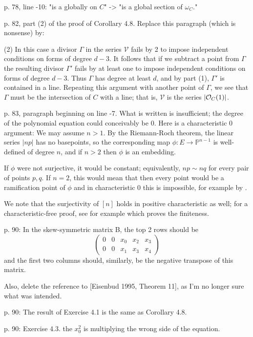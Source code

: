 \documentclass[twoside,12pt, leqno]{amsart}
\def\PP{{\mathbb P}}
\begin{document}
p. 78, line -10: "is a globally on $C$" -> "is a global section of $\omega_C$."

p. 82, part (2) of the proof of Corollary 4.8. Replace this paragraph (which is nonsense) by:

(2) In this case a divisor $\Gamma$ in the series $\mathcal V$ fails by 2 to impose independent conditions
on forms of degree $d-3$. It follows that if we subtract a point from $\Gamma$ the resulting divisor $\Gamma'$ fails
by at least one to impose independent conditions on forms of degree $d-3$. Thus $\Gamma$ has degree
at least $d$, and by part (1), $\Gamma'$ is contained in a line. Repeating this argument with another point of $\Gamma$,
we see that $\Gamma$ must be the intersection of $C$ with a line; that is, $\mathcal V$ is the series $|{\mathcal O}_C(1)|$.

p. 83, paragraph beginning on line -7. What is written is insufficient; the degree of the polynomial equation could conceivably be 0.  Here is a characteristic 0 argument:
We may assume $n>1$. By the Riemann-Roch theorem, the linear series $|np|$ has no basepoints, so the corresponding map $\phi: E \to \PP^{n-1}$ 
is well-defined of degree $n$, and if $n>2$ then $\phi$ is an embedding.

 If $\phi$ were not surjective, it would be constant; equivalently, $np\sim nq$ for every
pair of points $p,q$. If $n=2$, this would mean that  then every point would be a ramification point of 
$\phi$ and in characteristic 0 this is impossible, for example by \cite[Theorem 7.11a]{3264}.

We note that the surjectivity of $[n]$ holds in positive characteristic as well; for a characteristic-free proof, see for example \cite[Corollary 6.4]{Silverman} which proves the finiteness.

p. 90: In the skew-symmetric matrix B, the top 2 rows should be
$$
\begin{pmatrix}
 0&0&x_{0}&x_{2}&x_{3}\\
  0&0&x_{1}&x_{3}&x_{4}
\end{pmatrix}
$$
and the first two columns should, similarly, be the negative transpose of this matrix.

Also, delete the reference to [Eisenbud 1995, Theorem 11], as I'm no longer sure what
was intended.

p. 90: The result of Exercise 4.1 is the same as Corollary 4.8.


p. 90: Exercise 4.3. the $x_0^2$ is multiplying the wrong side of the equation.
\end{document}
